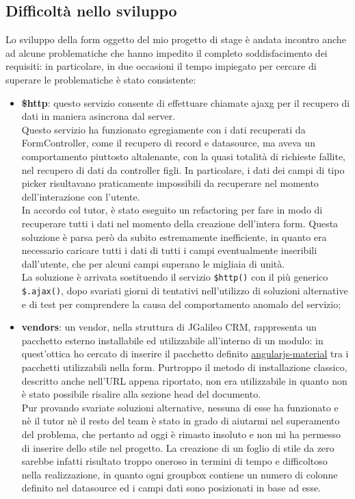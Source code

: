 \subsection{Difficoltà nello sviluppo}
\label{cap: diff_sviluppo}
Lo sviluppo della form oggetto del mio progetto di stage è andata incontro anche ad alcune problematiche che hanno impedito il completo soddisfacimento dei requisiti: in particolare, in due occasioni il tempo impiegato per cercare di superare le problematiche è stato consistente:
\begin{itemize}
	\item \textbf{\$http}: questo servizio consente di effettuare chiamate \gls{ajaxg} per il recupero di dati in maniera asincrona dal server.\\
	Questo servizio ha funzionato egregiamente con i dati recuperati da FormController, come il recupero di record e datasource, ma aveva un comportamento piuttosto altalenante, con la quasi totalità di richieste fallite, nel recupero di dati da controller figli. In particolare, i dati dei campi di tipo picker risultavano praticamente impossibili da recuperare nel momento dell'interazione con l'utente.\\
	In accordo col tutor, è stato eseguito un refactoring per fare in modo di recuperare tutti i dati nel momento della creazione dell'intera form. Questa soluzione è parsa però da subito estremamente inefficiente, in quanto era necessario caricare tutti i dati di tutti i campi eventualmente inseribili dall'utente, che per alcuni campi superano le migliaia di unità. \\
	La soluzione è arrivata sostituendo il servizio \lstinline[language=HTML]!$http()! con il più generico \lstinline[language=HTML]!$.ajax()!, dopo svariati giorni di tentativi nell'utilizzo di soluzioni alternative e di test per comprendere la causa del comportamento anomalo del servizio;
	\item \textbf{vendors}: un vendor, nella struttura di JGalileo CRM, rappresenta un pacchetto esterno installabile ed utilizzabile all'interno di un modulo: in quest'ottica ho cercato di inserire il pacchetto definito \href{https://github.com/angular/material}{angularjs-material} tra i pacchetti utilizzabili nella form. Purtroppo il metodo di installazione classico, descritto anche nell'URL appena riportato, non era utilizzabile in quanto non è stato possibile risalire alla sezione head del documento.\\ Pur provando svariate soluzioni alternative, nessuna di esse ha funzionato e nè il tutor nè il resto del team è stato in grado di aiutarmi nel superamento del problema, che pertanto ad oggi è rimasto insoluto e non mi ha permesso di inserire dello stile nel progetto. La creazione di un foglio di stile da zero sarebbe infatti risultato troppo oneroso in termini di tempo e difficoltoso nella realizzazione, in quanto ogni groupbox contiene un numero di colonne definito nel datasource ed i campi dati sono posizionati in base ad esse.
\end{itemize}
\newpage
